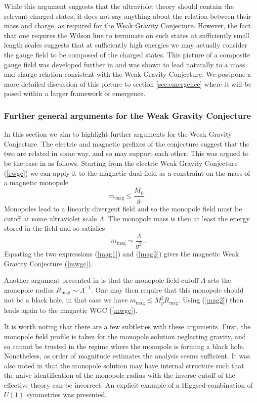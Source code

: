 \documentclass[11pt,a4paper]{article}
\numberwithin{equation}{section}
\numberwithin{table}{section}\setlength{\multlinegap}{25pt}
\newcommand{\be}{\begin{equation}}
\newcommand{\ee}{\end{equation}}
\begin{document}
While this argument suggests that the ultraviolet theory should contain the relevant charged states, it does not say anything about the relation between their mass and charge, as required for the Weak Gravity Conjecture. However, the fact that one requires the Wilson line to terminate on such states at sufficiently small length scales suggests that at sufficiently high energies we may actually consider the gauge field to be composed of the charged states. This picture of a composite gauge field was developed further in \cite{Harlow:2015lma} and was shown to lead naturally to a mass and charge relation consistent with the Weak Gravity Conjecture.  We postpone a more detailed discussion of this picture to section \ref{sec:emergence} where it will be posed within a larger framework of emergence.

\subsubsection{Further general arguments for the Weak Gravity Conjecture}
\label{sec:further}

In this section we aim to highlight further arguments for the Weak Gravity Conjecture. The electric and magnetic prefixes of the conjecture suggest that the two are related in some way, and so may support each other. This was argued to be the case in \cite{ArkaniHamed:2006dz} as follows. Starting from the electric Weak Gravity Conjecture (\ref{ewgc}) we can apply it to the magnetic dual field as a constraint on the mass of a magnetic monopole
\be
\label{mag1}
m_{\mathrm{mag}} \leq \frac{M_p}{g} \;.
\ee
Monopoles lead to a linearly divergent field and so the monopole field must be cutoff at some ultraviolet scale $\Lambda$. The monopole mass is then at least the energy stored in the field and so satisfies 
\be
\label{mag2}
m_{\mathrm{mag}} \sim \frac{\Lambda}{g^2} \;.
\ee
Equating the two expressions (\ref{mag1}) and (\ref{mag2}) gives the magnetic Weak Gravity Conjecture (\ref{mwgc}).

Another argument presented in \cite{ArkaniHamed:2006dz} is that the monopole field cutoff $\Lambda$ sets the monopole radius $R_{\mathrm{mag}}\sim \Lambda^{-1}$. One may then require that this monopole should not be a black hole, in that case we have $m_{\mathrm{mag}} \lesssim M_p^2 R_{\mathrm{mag}}$. Using (\ref{mag2}) then leads again to the magnetic WGC (\ref{mwgc}). 

It is worth noting that there are a few subtleties with these arguments. First, the monopole field profile is taken for the monopole solution neglecting gravity, and so cannot be trusted in the regime where the monopole is forming a black hole. Nonetheless, as order of magnitude estimates the analysis seems sufficient. It was also noted in \cite{Saraswat:2016eaz} that the monopole solution may have internal structure such that the naive identification of the monopole radius with the inverse cutoff of the effective theory can be incorrect. An explicit example of a Higgsed combination of $U(1)$ symmetries was presented. 
\end{document}
